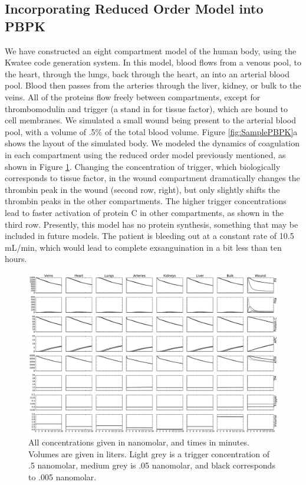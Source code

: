 \documentclass[12pt]{article}
\begin{document}
\subsection*{Incorporating Reduced Order Model into PBPK}
We have constructed an eight compartment model of the human body, using the Kwatee code generation system. In this model, blood flows from a venous pool, to the heart, through the lungs, back through the heart, an into an arterial blood pool. Blood then passes from the arteries through the liver, kidney, or bulk to the veins. All of the proteins flow freely between compartments, except for thrombomodulin and trigger (a stand in for tissue factor), which are bound to cell membranes.\cite{esmon1989roles} We simulated a small wound being present to the arterial blood pool, with a volume of .5\% of the total blood volume. Figure \ref{fig:SamplePBPK}a shows the layout of the simulated body. We modeled the dynamics of coagulation in each compartment using the reduced order model previously mentioned, as shown in Figure \ref{fig:comparsionoftrigger}. Changing the concentration of trigger, which biologically corresponds to tissue factor, in the wound compartment dramatically changes the thrombin peak in the wound (second row, right), but only slightly shifts the thrombin peaks in the other compartments. The higher trigger concentrations lead to faster activation of protein C in other compartments, as shown in the third row. Presently, this model has no protein synthesis, something that may be included in future models. The patient is bleeding out at a constant rate of 10.5 mL/min, which would lead to complete exsanguination in a bit less than ten hours.
\begin{figure}
        \includegraphics[width=\textwidth]{figures/ComparisonofTriggerValuesNewLayout}
        \caption{\scriptsize All concentrations given in nanomolar, and times in minutes. Volumes are given in liters. Light grey is a trigger concentration of .5 nanomolar, medium grey is .05 nanomolar, and black corresponds to .005 nanomolar. }
        \label{fig:comparsionoftrigger}
\end{figure}
\end{document}
